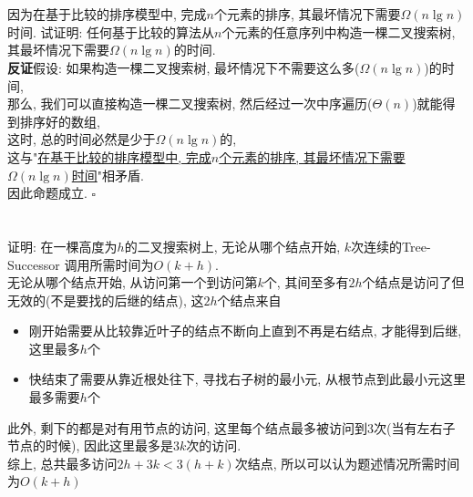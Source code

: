 \documentclass[UTF8]{article}
\begin{document}
\section{}
\noindent 因为在基于比较的排序模型中, 完成$n$个元素的排序, 其最坏情况下需要$\Omega(n\lg n)$时间. 试证明: 任何基于比较的算法从$n$个元素的任意序列中构造一棵二叉搜索树, 其最坏情况下需要$\Omega(n\lg n)$的时间.\\

\noindent \textbf{反证}假设: 如果构造一棵二叉搜索树, 最坏情况下不需要这么多($\Omega(n\lg n)$)的时间, \\
那么, 我们可以直接构造一棵二叉搜索树, 然后经过一次中序遍历($\Theta(n)$)就能得到排序好的数组, \\
这时, 总的时间必然是少于$\Omega(n\lg n)$的, \\
这与"\underline{在基于比较的排序模型中, 完成$n$个元素的排序, 其最坏情况下需要$\Omega(n\lg n)$时间}"相矛盾.\\
因此命题成立.
\hfill$\square$

\newpage
\section{}
\noindent 证明: 在一棵高度为$h$的二叉搜索树上, 无论从哪个结点开始, $k$次连续的{\sc Tree-Successor} 调用所需时间为$O(k+h)$.\\

\noindent 无论从哪个结点开始, 从访问第一个到访问第$k$个, 其间至多有$2h$个结点是访问了但无效的(不是要找的后继的结点), 这$2h$个结点来自
\begin{itemize}
	\item 刚开始需要从比较靠近叶子的结点不断向上直到不再是右结点, 才能得到后继, 这里最多$h$个
	\item 快结束了需要从靠近根处往下, 寻找右子树的最小元, 从根节点到此最小元这里最多需要$h$个
\end{itemize}
此外, 剩下的都是对有用节点的访问, 这里每个结点最多被访问到3次(当有左右子节点的时候), 因此这里最多是$3k$次的访问.\\
综上, 总共最多访问$2h+3k<3(h+k)$次结点, 所以可以认为题述情况所需时间为$O(k+h)$
\end{document}
